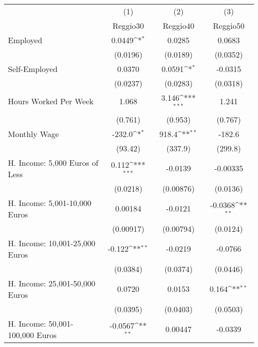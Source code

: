 {
\def\sym#1{\ifmmode^{#1}\else\(^{#1}\)\fi}
\begin{tabular}{l*{3}{c}}
\hline\hline
            &\multicolumn{1}{c}{(1)}&\multicolumn{1}{c}{(2)}&\multicolumn{1}{c}{(3)}\\
            &\multicolumn{1}{c}{Reggio30}&\multicolumn{1}{c}{Reggio40}&\multicolumn{1}{c}{Reggio50}\\
\hline
Employed    &      0.0449\sym{*}  &      0.0285         &      0.0683         \\
            &    (0.0196)         &    (0.0189)         &    (0.0352)         \\
[1em]
Self-Employed&      0.0370         &      0.0591\sym{*}  &     -0.0315         \\
            &    (0.0237)         &    (0.0283)         &    (0.0318)         \\
[1em]
Hours Worked Per Week&       1.068         &       3.146\sym{***}&       1.241         \\
            &     (0.761)         &     (0.953)         &     (0.767)         \\
[1em]
Monthly Wage&      -232.0\sym{*}  &       918.4\sym{**} &      -182.6         \\
            &     (93.42)         &     (337.9)         &     (299.8)         \\
[1em]
H. Income: 5,000 Euros of Less&       0.112\sym{***}&     -0.0139         &    -0.00335         \\
            &    (0.0218)         &   (0.00876)         &    (0.0136)         \\
[1em]
H. Income: 5,001-10,000 Euros&     0.00184         &     -0.0121         &     -0.0368\sym{**} \\
            &   (0.00917)         &   (0.00794)         &    (0.0124)         \\
[1em]
H. Income: 10,001-25,000 Euros&      -0.122\sym{**} &     -0.0219         &     -0.0766         \\
            &    (0.0384)         &    (0.0374)         &    (0.0446)         \\
[1em]
H. Income: 25,001-50,000 Euros&      0.0720         &      0.0153         &       0.164\sym{**} \\
            &    (0.0395)         &    (0.0403)         &    (0.0503)         \\
[1em]
H. Income: 50,001-100,000 Euros&     -0.0567\sym{**} &     0.00447         &     -0.0339         \\

\end{tabular}}

